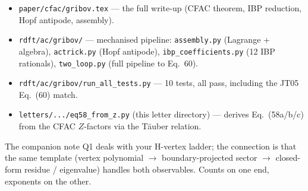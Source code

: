\documentclass[11pt,a4paper]{article}
\begin{document}
\begin{itemize}[leftmargin=2em,itemsep=2pt]
  \item \texttt{paper/cfac/gribov.tex} --- the full write-up (CFAC theorem, IBP reduction, Hopf antipode, assembly).
  \item \texttt{rdft/ac/gribov/} --- mechanised pipeline:
    \texttt{assembly.py} (Lagrange + algebra),
    \texttt{actrick.py} (Hopf antipode),
    \texttt{ibp\_coefficients.py} (12 IBP rationals),
    \texttt{two\_loop.py} (full pipeline to Eq.~60).
  \item \texttt{rdft/ac/gribov/run\_all\_tests.py} --- 10 tests, all pass, including the JT05 Eq.~(60) match.
  \item \texttt{letters/.../eq58\_from\_z.py} (this letter directory) --- derives Eq.~(58a/b/c) from the CFAC $Z$-factors via the T\"auber relation.
\end{itemize}

\medskip
\noindent The companion note Q1 deals with your H-vertex ladder; the connection is that the same template (vertex polynomial $\to$ boundary-projected sector $\to$ closed-form residue / eigenvalue) handles both observables. Counts on one end, exponents on the other.
\end{document}
